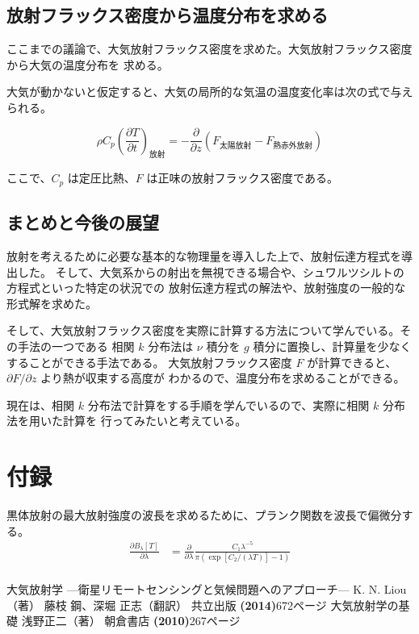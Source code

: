 \documentclass[book]{dennou777}
\begin{document}
\section{放射フラックス密度から温度分布を求める}
ここまでの議論で、大気放射フラックス密度を求めた。大気放射フラックス密度から大気の温度分布を
求める。

大気が動かないと仮定すると、大気の局所的な気温の温度変化率は次の式で与えられる。

\begin{equation}
	\rho C_p\left(\frac{\partial T}{\partial t}\right)_\text{放射}
	=-\frac{\partial}{\partial z}(F_\text{太陽放射}-F_\text{熱赤外放射})
\end{equation}

ここで、$C_p$ は定圧比熱、$F$ は正味の放射フラックス密度である。

\section{まとめと今後の展望}

放射を考えるために必要な基本的な物理量を導入した上で、放射伝達方程式を導出した。
そして、大気系からの射出を無視できる場合や、シュワルツシルトの方程式といった特定の状況での
放射伝達方程式の解法や、放射強度の一般的な形式解を求めた。

そして、大気放射フラックス密度を実際に計算する方法について学んでいる。その手法の一つである
相関 $k$ 分布法は $\nu$ 積分を $g$ 積分に置換し、計算量を少なくすることができる手法である。
大気放射フラックス密度 $F$ が計算できると、$\partial F/\partial z$ より熱が収束する高度が
わかるので、温度分布を求めることができる。

現在は、相関 $k$ 分布法で計算をする手順を学んでいるので、実際に相関 $k$ 分布法を用いた計算を
行ってみたいと考えている。

\clearpage
\appendix
\chapter{付録}
黒体放射の最大放射強度の波長を求めるために、プランク関数を波長で偏微分する。
\begin{align*}
\frac{\partial B_\lambda[T]}{\partial\lambda}
&=\frac{\partial}{\partial\lambda}\frac{C_1\lambda^{-5}}{\pi(\exp[C_2/(\lambda T)]-1)}\\

\end{align*}

\clearpage
\begin{thebibliography}{9}
	 大気放射学 ---衛星リモートセンシングと気候問題へのアプローチ---
		K. N. Liou（著） 藤枝 鋼、深堀 正志（翻訳）
		共立出版 \textbf{(2014)}\quad672ページ
	 大気放射学の基礎 浅野正二（著） 朝倉書店 \textbf{(2010)}\quad267ページ
\end{thebibliography}

\pagebreak
\listoffigures
\listoftables
\end{document}
